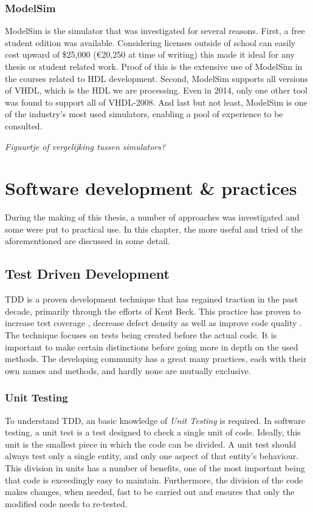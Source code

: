 \documentclass[11pt,british]{article}
\begin{document}
\subsubsection{ModelSim}
ModelSim is the simulator that was investigated for several reasons. First, a free student edition was available. Considering licenses  outside of school can easily cost upward of \$25,000 (\euro20,250 at time of writing) this made it ideal for any thesis or student related work. Proof of this is the extensive use of ModelSim in the courses related to HDL development. Second, ModelSim supports all versions of \gls{VHDL}, which is the \gls{HDL} we are processing. Even in 2014, only one other tool was found to support all of VHDL-2008. And last but not least, ModelSim is one of the industry's most used simulators, enabling a pool of experience to be consulted.

\emph{\color{red}Figuurtje of vergelijking tussen simulators?}


\section{Software development \& practices}
During the making of this thesis, a number of approaches was investigated and some were put to practical use. In this chapter, the more useful and tried of the aforementioned are discussed in some detail.


\subsection{Test Driven Development}
\gls{TDD} is a proven development technique that has regained traction in the past decade, primarily through the efforts of Kent Beck\cite{VHDLUnit}. This practice has proven to increase test coverage \cite{Siniaalto:2007:CCS:1302496.1302946}, decrease defect density \cite{TDDinpractice} as well as improve code quality \cite{TDDinpractice,conf/isese/BhatN06}. The technique focuses on tests being created before the actual code. It is important to make certain distinctions before going more in depth on the used methods. The developing community has a great many practices, each with their own names and methods, and hardly none are mutually exclusive.

\subsubsection{Unit Testing}
To understand \gls{TDD}, an basic knowledge of \emph{Unit Testing} is required. In software testing, a unit test is a test designed to check a single unit of code. Ideally, this unit is the smallest piece in which the code can be divided. A unit test should always test only a single entity, and only one aspect of that entity's behaviour. This division in units has a number of benefits, one of the most important being that code is exceedingly easy to maintain. Furthermore, the division of the code makes changes, when needed, fast to be carried out and ensures that only the modified code needs to re-tested.
\end{document}

